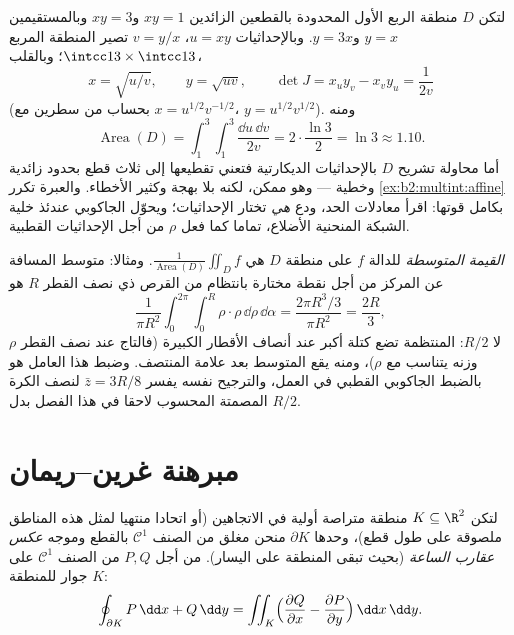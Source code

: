 \begin{example}\label{ex:b2:multint:hyperbolicregion}
لتكن $D$ منطقة الربع الأول المحدودة بالقطعين الزائدين $xy = 1$
و$xy = 3$ وبالمستقيمين $y = x$ و$y = 3x$. وبالإحداثيات $u = xy$، $v = y/x$
تصير المنطقة المربع $\intcc13 \times \intcc13$؛ وبالقلب،
\[
x = \sqrt{u/v}, \qquad y = \sqrt{uv},
\qquad
\det J = x_uy_v - x_vy_u = \frac{1}{2v}
\]
(بحساب من سطرين مع $x = u^{1/2}v^{-1/2}$، $y =
u^{1/2}v^{1/2}$). ومنه
\[
\operatorname{Area}(D)
= \int_1^3\!\!\int_1^3\frac{\dd u\,\dd v}{2v}
= 2\cdot\frac{\ln 3}{2} = \ln 3 \approx 1.10 .
\]
أما محاولة تشريح $D$ بالإحداثيات الديكارتية فتعني تقطيعها إلى
ثلاث قطع بحدود زائدية وخطية --- وهو ممكن، لكنه بلا بهجة وكثير
الأخطاء. والعبرة تكرر \cref{ex:b2:multint:affine} بكامل قوتها: اقرأ معادلات الحد، ودع
\emph{هي} تختار الإحداثيات؛ ويحوّل الجاكوبي عندئذ  خلية الشبكة
المنحنية الأضلاع، تماما كما فعل $\rho$ من أجل الإحداثيات القطبية.
\end{example}

\begin{example}\label{ex:b2:multint:average}
\emph{القيمة المتوسطة} للدالة $f$ على منطقة $D$ هي $\frac1{\operatorname{Area}(D)}\iint_Df$.
ومثالا: متوسط المسافة عن المركز من أجل نقطة مختارة بانتظام من القرص
ذي نصف القطر $R$ هو
\[
\frac{1}{\pi R^2}\int_0^{2\pi}\!\!\int_0^R
\rho\cdot\rho\,\dd\rho\,\dd\alpha
= \frac{2\pi R^3/3}{\pi R^2} = \frac{2R}3 ,
\]
لا $R/2$:  المنتظمة تضع كتلة أكبر عند أنصاف الأقطار
الكبيرة (فالتاج عند نصف القطر $\rho$ وزنه يتناسب مع $\rho$)، ومنه
يقع المتوسط بعد علامة المنتصف. وضبط هذا العامل هو بالضبط الجاكوبي
القطبي في العمل، والترجيح نفسه يفسر  $\bar z = 3R/8$ لنصف الكرة
المصمتة المحسوب لاحقا في هذا الفصل بدل $R/2$.
\end{example}

\section{مبرهنة غرين--ريمان}

\begin{theorem}\label{thm:b2:multint:green}
لتكن $K \subseteq \R^2$ منطقة متراصة أولية في الاتجاهين (أو اتحادا منتهيا لمثل
هذه المناطق ملصوقة على طول قطع)، وحدها $\partial K$ منحن مغلق من الصنف
$\mathcal{C}^1$ بالقطع وموجه \emph{عكس عقارب الساعة} (بحيث تبقى المنطقة على
اليسار). من أجل $P, Q$ من الصنف $\mathcal{C}^1$ على جوار للمنطقة $K$:
\[
\oint_{\partial K} P\,\dd x + Q\,\dd y
= \iint_K \Bigl(\frac{\partial Q}{\partial x}
- \frac{\partial P}{\partial y}\Bigr)\,\dd x\,\dd y .
\]
\end{theorem}

